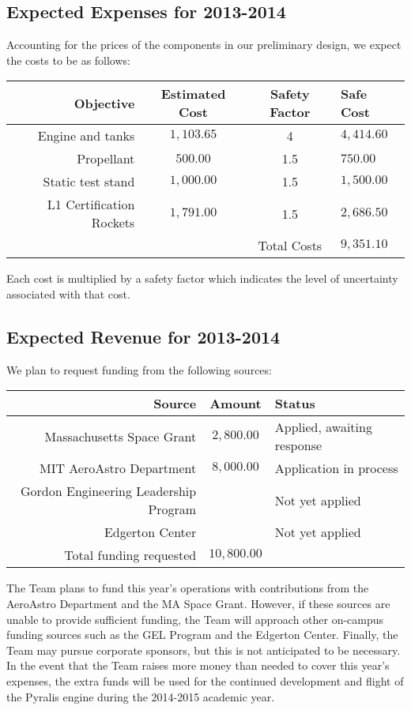 \documentclass{article}
\begin{document}
\subsection*{Expected Expenses for 2013-2014}
Accounting for the prices of the components in our preliminary design, we expect the costs to be as follows:\\
\begin{tabular}{r | c | c || l}
Objective & Estimated Cost & Safety Factor & Safe Cost \\
\hline
Engine and tanks & $1,103.65$ & 4 & $4,414.60$ \\
Propellant & $500.00$ & 1.5 & $750.00$ \\
Static test stand & $1,000.00$ & 1.5 & $1,500.00$ \\
L1 Certification Rockets & $1,791.00$ & 1.5 & $2,686.50$ \\
\hline
 & & Total Costs & $9,351.10$ \\
\end{tabular}

Each cost is multiplied by a safety factor which indicates the level of uncertainty associated with that cost.
\subsection*{Expected Revenue for 2013-2014}
We plan to request funding from the following sources:\\

\begin{tabular}{r|c|l}
Source & Amount & Status \\
\hline
Massachusetts Space Grant & $2,800.00$ & Applied, awaiting response \\
MIT AeroAstro Department & $8,000.00$ & Application in process \\
Gordon Engineering Leadership Program & & Not yet applied \\
Edgerton Center &  & Not yet applied \\
\hline
Total funding requested & $10,800.00$ & \\
\end{tabular}

The Team plans to fund this year's operations with contributions from the AeroAstro Department and the MA Space Grant. However, if these sources are unable to provide sufficient funding, the Team will approach other on-campus funding sources such as the GEL Program and the Edgerton Center. Finally, the Team may pursue corporate sponsors, but this is not anticipated to be necessary. In the event that the Team raises more money than needed to cover this year's expenses, the extra funds will be used for the continued development and flight of the Pyralis engine during the 2014-2015 academic year. 
\end{document}
